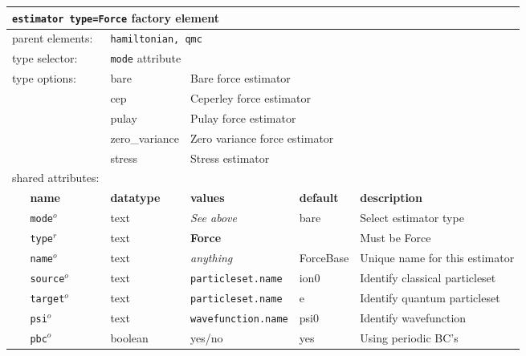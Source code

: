 \FloatBarrier
\begin{table}[h]
\begin{center}
\begin{tabularx}{\textwidth}{l l l l l l }
\hline
\multicolumn{6}{l}{\texttt{estimator type=Force} factory element} \\
\hline
\multicolumn{2}{l}{parent elements:} & \multicolumn{4}{l}{\texttt{hamiltonian, qmc}}\\
\multicolumn{2}{l}{type   selector:} & \multicolumn{4}{l}{\texttt{mode} attribute}\\
\multicolumn{2}{l}{type   options: } & bare           & \multicolumn{3}{l}{Bare force estimator}\\
\multicolumn{2}{l}{                } & cep            & \multicolumn{3}{l}{Ceperley force estimator}\\
\multicolumn{2}{l}{                } & pulay          & \multicolumn{3}{l}{Pulay force estimator}\\
\multicolumn{2}{l}{                } & zero\_variance & \multicolumn{3}{l}{Zero variance force estimator}\\
\multicolumn{2}{l}{                } & stress         & \multicolumn{3}{l}{Stress estimator}\\
\multicolumn{2}{l}{shared attributes:} & \multicolumn{4}{l}{}\\
   &   \bfseries name     & \bfseries datatype & \bfseries values & \bfseries default   & \bfseries description \\
   &   \texttt{mode}$^o$      &  text              & \textit{See above}        & bare          & Select estimator type\\
   &   \texttt{type}$^r$      &  text              & \textbf{Force}            &               & Must be Force         \\
   &   \texttt{name}$^o$      &  text              & \textit{anything}         & ForceBase     & Unique name for this estimator\\
   &   \texttt{source}$^o$    &  text              & \texttt{particleset.name} & ion0          & Identify classical particleset\\
   &   \texttt{target}$^o$    &  text              & \texttt{particleset.name} & e             & Identify quantum particleset\\
   &   \texttt{psi}$^o$       &  text              & \texttt{wavefunction.name}& psi0          & Identify wavefunction\\
   &   \texttt{pbc}$^o$       &  boolean           & yes/no                    & yes           & Using periodic BC's\\
\hline
\end{tabularx}
\end{center}
\end{table}
\FloatBarrier
